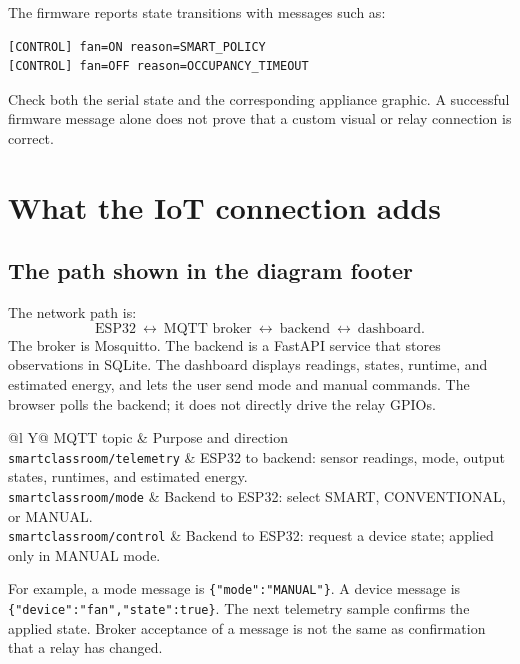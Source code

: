 \documentclass[11pt,a4paper]{article}
\begin{document}
The firmware reports state transitions with messages such as:
\begin{lstlisting}
[CONTROL] fan=ON reason=SMART_POLICY
[CONTROL] fan=OFF reason=OCCUPANCY_TIMEOUT
\end{lstlisting}
Check both the serial state and the corresponding appliance graphic.
A successful firmware message alone does not prove that a custom
visual or relay connection is correct.

\section{What the IoT connection adds}
\subsection{The path shown in the diagram footer}
The network path is:
\[
 \text{ESP32}\ \longleftrightarrow\ \text{MQTT broker}\
 \longleftrightarrow\ \text{backend}\
 \longleftrightarrow\ \text{dashboard}.
\]
The broker is Mosquitto. The backend is a FastAPI service that stores
observations in SQLite. The dashboard displays readings, states,
runtime, and estimated energy, and lets the user send mode and manual
commands. The browser polls the backend; it does not directly drive
the relay GPIOs.

\begin{table}[htbp]
\centering
\begin{tabularx}{\textwidth}{@{}l Y@{}}
\toprule
MQTT topic & Purpose and direction \\
\midrule
\nolinkurl{smartclassroom/telemetry} & ESP32 to backend: sensor readings, mode,
output states, runtimes, and estimated energy. \\
\nolinkurl{smartclassroom/mode} & Backend to ESP32: select SMART,
CONVENTIONAL, or MANUAL. \\
\nolinkurl{smartclassroom/control} & Backend to ESP32: request a device
state; applied only in MANUAL mode. \\
\bottomrule
\end{tabularx}
\end{table}

For example, a mode message is \lstinline|{"mode":"MANUAL"}|.
A device message is \lstinline|{"device":"fan","state":true}|.
The next telemetry sample confirms the applied state. Broker acceptance
of a message is not the same as confirmation that a relay has changed.
\end{document}
